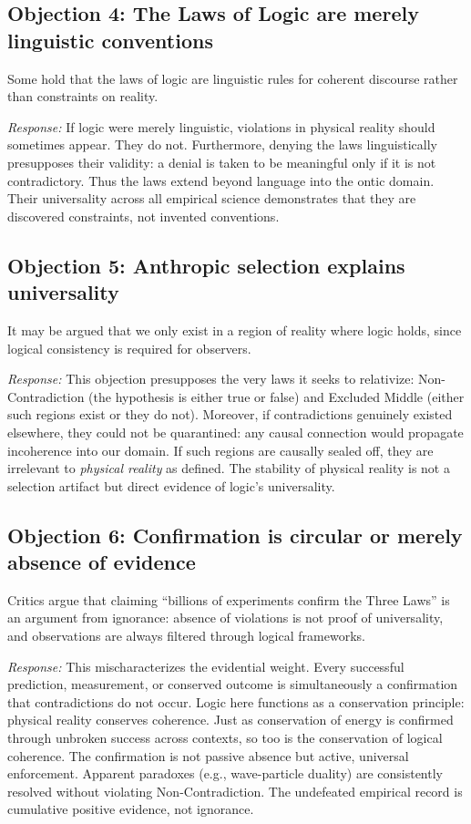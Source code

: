 \documentclass[12pt]{article}
\begin{document}
\subsection*{Objection 4: The Laws of Logic are merely linguistic conventions}
Some hold that the laws of logic are linguistic rules for coherent discourse rather than constraints on reality.

\emph{Response:} If logic were merely linguistic, violations in physical reality should sometimes appear. They do not. Furthermore, denying the laws linguistically presupposes their validity: a denial is taken to be meaningful only if it is not contradictory. Thus the laws extend beyond language into the ontic domain. Their universality across all empirical science demonstrates that they are discovered constraints, not invented conventions.

\subsection*{Objection 5: Anthropic selection explains universality}
It may be argued that we only exist in a region of reality where logic holds, since logical consistency is required for observers.

\emph{Response:} This objection presupposes the very laws it seeks to relativize: Non-Contradiction (the hypothesis is either true or false) and Excluded Middle (either such regions exist or they do not). Moreover, if contradictions genuinely existed elsewhere, they could not be quarantined: any causal connection would propagate incoherence into our domain. If such regions are causally sealed off, they are irrelevant to \emph{physical reality} as defined. The stability of physical reality is not a selection artifact but direct evidence of logic’s universality.

\subsection*{Objection 6: Confirmation is circular or merely absence of evidence}
Critics argue that claiming ``billions of experiments confirm the Three Laws'' is an argument from ignorance: absence of violations is not proof of universality, and observations are always filtered through logical frameworks.

\emph{Response:} This mischaracterizes the evidential weight. Every successful prediction, measurement, or conserved outcome is simultaneously a confirmation that contradictions do not occur. Logic here functions as a conservation principle: physical reality conserves coherence. Just as conservation of energy is confirmed through unbroken success across contexts, so too is the conservation of logical coherence. The confirmation is not passive absence but active, universal enforcement. Apparent paradoxes (e.g., wave-particle duality) are consistently resolved without violating Non-Contradiction. The undefeated empirical record is cumulative positive evidence, not ignorance.
\end{document}
